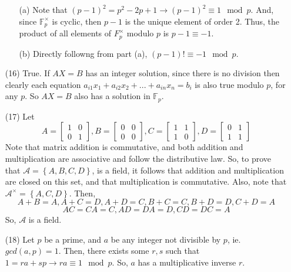 \documentclass[12pt]{article}
\begin{document}
\begin{itemize}
\begin{itemize}
\item[(a)]
Note that $(p - 1)^2 = p^2 - 2p + 1 \rightarrow (p - 1)^2 \equiv 1 \mod p$. And, since $\mathbb{F}_p^\times$ is cyclic, then $p - 1$ is the unique element of order 2. Thus, the product of all elements of $F_p^\times$ modulo $p$ is $p - 1 \equiv -1$.
\item[(b)]
Directly followng from part (a), $(p - 1)! \equiv -1 \mod p$.
\end{itemize}
\item[(16)]
True. If $AX = B$ has an integer solution, since there is no division then clearly each equation $a_{i1}x_1 + a_{i2}x_2 + ... + a_{in}x_n = b_i$ is also true modulo $p$, for any $p$. So $AX = B$ also has a solution in $\mathbb{F}_p$.
\item[(17)]
Let
$$A = \begin{bmatrix}
1 & 0 \\
0 & 1
\end{bmatrix}, B = \begin{bmatrix}
0 & 0 \\
0 & 0
\end{bmatrix}, C = \begin{bmatrix}
1 & 1 \\
1 & 0
\end{bmatrix}, D = \begin{bmatrix}
0 & 1 \\
1 & 1
\end{bmatrix}$$
Note that matrix addition is commutative, and both addition and multiplication are associative and follow the distributive law. So, to prove that $\mathcal{A} = \left\lbrace A, B, C, D \right\rbrace$, is a field, it follows that addition and multiplication are closed on this set, and that multiplication is commutative. Also, note that $\mathcal{A}^\times = \left\lbrace A, C, D \right\rbrace$.
Then,
$$A + B = A, A + C = D, A + D = C, B + C = C, B + D = D, C + D = A$$
$$AC = CA = C, AD = DA = D, CD = DC = A$$
So, $\mathcal{A}$ is a field.
\item[(18)]
Let $p$ be a prime, and $a$ be any integer not divisible by $p$, ie. $gcd(a, p) = 1$. Then, there exists some $r, s$ such that $1 = ra + sp \rightarrow ra \equiv 1 \mod p$. So, $a$ has a multiplicative inverse $r$.
\end{itemize}
\end{document}
